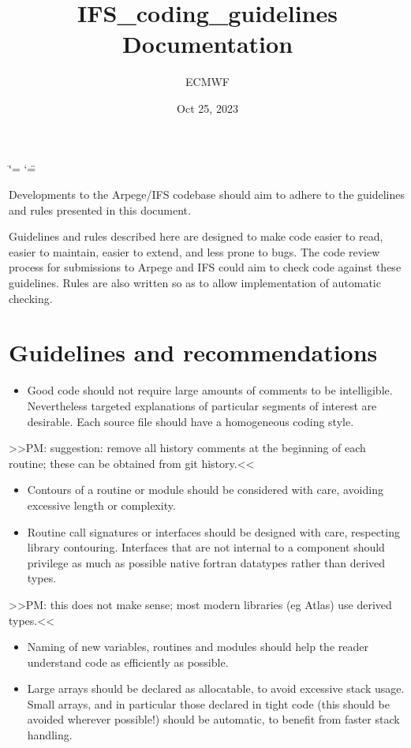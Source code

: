 \documentclass[letterpaper,10pt,english]{sphinxmanual}
\title{IFS\_coding\_guidelines Documentation}
\date{Oct 25, 2023}
\author{ECMWF}
\begin{document}
\ifdefined\shorthandoff
  \ifnum\catcode`\=\string=\active\shorthandoff{=}\fi
  \ifnum\catcode`\"=\active{}\fi
\fi

\pagestyle{empty}
\sphinxmaketitle
\pagestyle{plain}
\sphinxtableofcontents
\pagestyle{normal}
\label{\detokenize{index::doc}}


Developments to the Arpege/IFS codebase should aim to adhere to the guidelines
and rules presented in this document.

Guidelines and rules described here are designed to make code easier to read,
easier to maintain, easier to extend, and less prone to bugs.
The code review process for submissions to Arpege and IFS could aim to check
code against these guidelines.
Rules are also written so as to allow implementation of automatic checking.


\chapter{Guidelines and recommendations}
\label{\detokenize{index:guidelines-and-recommendations}}\begin{itemize}
\item {} 
Good code should not require large amounts of comments to be intelligible.
Nevertheless targeted explanations of particular segments of interest are desirable.
Each source file should have a homogeneous coding style.

\end{itemize}

\textgreater{}\textgreater{}PM: suggestion: remove all history comments at the beginning of each routine; these can
be obtained from git history.\textless{}\textless{}
\begin{itemize}
\item {} 
Contours of a routine or module should be considered with care, avoiding excessive length
or complexity.

\item {} 
Routine call signatures or interfaces should be designed with care, respecting library
contouring. Interfaces that are not internal to a component should privilege as much as
possible native fortran datatypes rather than derived types.

\end{itemize}

\textgreater{}\textgreater{}PM: this does not make sense; most modern libraries (eg Atlas) use derived types.\textless{}\textless{}
\begin{itemize}
\item {} 
Naming of new variables, routines and modules should help the reader understand code as efficiently
as possible. 

\item {} 
Large arrays should be declared as allocatable, to avoid excessive stack usage.
Small arrays, and in particular those declared in tight code (this should be avoided wherever
possible!) should be automatic, to benefit from faster stack handling.

\end{itemize}
\end{document}
